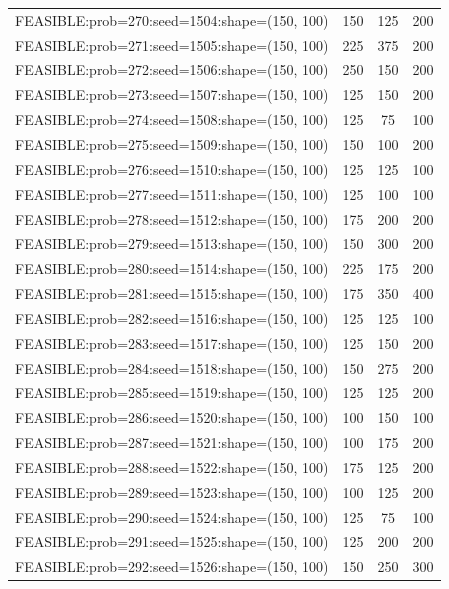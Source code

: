 \begin{longtable}{lccc}
FEASIBLE:prob=270:seed=1504:shape=(150, 100) &      150 &   125 &    200 \\
FEASIBLE:prob=271:seed=1505:shape=(150, 100) &      225 &   375 &    200 \\
FEASIBLE:prob=272:seed=1506:shape=(150, 100) &      250 &   150 &    200 \\
FEASIBLE:prob=273:seed=1507:shape=(150, 100) &      125 &   150 &    200 \\
FEASIBLE:prob=274:seed=1508:shape=(150, 100) &      125 &    75 &    100 \\
FEASIBLE:prob=275:seed=1509:shape=(150, 100) &      150 &   100 &    200 \\
FEASIBLE:prob=276:seed=1510:shape=(150, 100) &      125 &   125 &    100 \\
FEASIBLE:prob=277:seed=1511:shape=(150, 100) &      125 &   100 &    100 \\
FEASIBLE:prob=278:seed=1512:shape=(150, 100) &      175 &   200 &    200 \\
FEASIBLE:prob=279:seed=1513:shape=(150, 100) &      150 &   300 &    200 \\
FEASIBLE:prob=280:seed=1514:shape=(150, 100) &      225 &   175 &    200 \\
FEASIBLE:prob=281:seed=1515:shape=(150, 100) &      175 &   350 &    400 \\
FEASIBLE:prob=282:seed=1516:shape=(150, 100) &      125 &   125 &    100 \\
FEASIBLE:prob=283:seed=1517:shape=(150, 100) &      125 &   150 &    200 \\
FEASIBLE:prob=284:seed=1518:shape=(150, 100) &      150 &   275 &    200 \\
FEASIBLE:prob=285:seed=1519:shape=(150, 100) &      125 &   125 &    200 \\
FEASIBLE:prob=286:seed=1520:shape=(150, 100) &      100 &   150 &    100 \\
FEASIBLE:prob=287:seed=1521:shape=(150, 100) &      100 &   175 &    200 \\
FEASIBLE:prob=288:seed=1522:shape=(150, 100) &      175 &   125 &    200 \\
FEASIBLE:prob=289:seed=1523:shape=(150, 100) &      100 &   125 &    200 \\
FEASIBLE:prob=290:seed=1524:shape=(150, 100) &      125 &    75 &    100 \\
FEASIBLE:prob=291:seed=1525:shape=(150, 100) &      125 &   200 &    200 \\
FEASIBLE:prob=292:seed=1526:shape=(150, 100) &      150 &   250 &    300 \\

\end{longtable}
